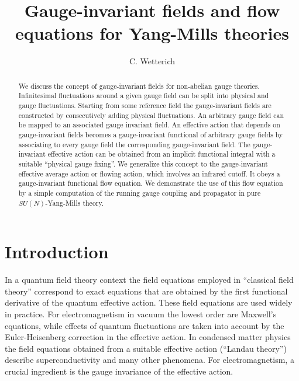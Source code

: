 \documentclass[twocolumn,aps,prd,amsmath,amssymb,preprintnumbers,longbibliography]{revtex4-1}
\numberwithin{equation}{section}
\begin{document}
\unitlength=1mm 

\title[ ]{Gauge-invariant fields and flow equations for Yang-Mills theories}

\author{C. Wetterich}



\begin{abstract}
We discuss the concept of gauge-invariant fields for non-abelian gauge theories. Infinitesimal fluctuations around a given gauge field can be split into physical and gauge fluctuations. Starting from some reference field the gauge-invariant fields are constructed by consecutively adding physical fluctuations. An arbitrary gauge field can be mapped to an associated gauge invariant field. An effective action that depends on gauge-invariant fields becomes a gauge-invariant functional of arbitrary gauge fields by associating to every gauge field the corresponding gauge-invariant field. The gauge-invariant effective action can be obtained from an implicit functional integral with a suitable ``physical gauge fixing''. We generalize this concept to the gauge-invariant effective average action or flowing action, which involves an infrared cutoff. It obeys a gauge-invariant functional flow equation. We demonstrate the use of this flow equation by a simple computation of the running gauge coupling and propagator in pure $SU(N)$-Yang-Mills theory.
\end{abstract}


\maketitle



\hypertarget{TOC}{\tableofcontents}

\section{Introduction}

In a quantum field theory context the field equations employed in ``classical field theory'' correspond to exact equations that are obtained by the first functional derivative of the quantum effective action. These field equations are used widely in practice. For electromagnetism in vacuum the lowest order are Maxwell's equations, while effects of quantum fluctuations are taken into account by the Euler-Heisenberg correction \cite{HE1,JS,HE2}\nocite{HE2} in the effective action. In condensed matter physics the field equations obtained from a suitable effective action (``Landau theory'') describe superconductivity and many other phenomena. For electromagnetism, a crucial ingredient is the gauge invariance of the effective action.
\end{document}
